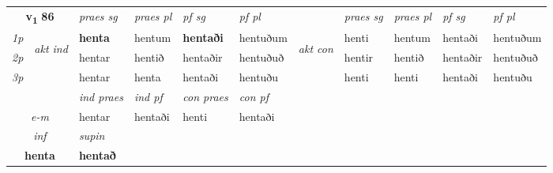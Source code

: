\noindent
\begin{tabular}{lllllllllll} \toprule
\multicolumn{2}{c}{\textbf{v{\textsubscript{1}}} \Large{\textbf{86}}}  &  \textit{praes sg}  & \textit{praes pl}  &\textit{ pf sg} & \textit{pf pl} &  &  \textit{praes sg}  & \textit{praes pl}  & \textit{pf sg} & \textit{pf pl } \\*
	\cmidrule{3-6} \cmidrule{8-11}
 {\textit{1p}} & \multirow{3}{*}{\begin{turn}{90}\textit{akt ind}\end{turn}} & \textbf{henta} & hentum & \textbf{hentaði} & hentuðum & \multirow{3}{*}{\begin{turn}{90}\textit{akt con}\end{turn}} &henti & hentum & hentaði & hentuðum\\*
 {\textit{2p}} &  &  hentar  & hentið & hentaðir & hentuðuð & & hentir & hentið & hentaðir & hentuðuð \\*
{\textit{3p}} &  & hentar & henta & hentaði & hentuðu & & henti & henti& hentaði & hentuðu \\*
\cmidrule{3-6} \cmidrule{8-11}

   & &  \textit{ind praes} & \textit{ind pf} & \textit{con praes} & \textit{con pf} \\*
\multicolumn{2}{c}{ \textit{e-m} } & hentar & hentaði & henti & hentaði \\*

\cmidrule{3-3}
   \multicolumn{2}{c}{\textit{inf}}      & \textit{supin}   \\*
  \multicolumn{2}{c}{\textbf{henta}}       &  \textbf{hentað}   \\*
\end{tabular}

